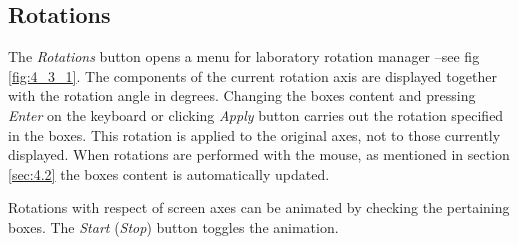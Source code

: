 \documentclass[10pt]{article}
\begin{document}
\subsection{Rotations \label{sec:4.3}}

The {\it Rotations} button opens a menu for laboratory rotation manager --see fig
\ref{fig:4_3_1}. The components of the current rotation axis are displayed together
with the rotation angle in degrees. Changing the boxes content and pressing {\it Enter} on the keyboard or clicking
{\it Apply} button carries out the rotation specified in the boxes.
This rotation is applied to the original axes, not to those currently displayed.
When rotations are performed with the mouse, as mentioned in section \ref{sec:4.2}
the boxes content is automatically updated.

Rotations with respect of screen axes can be animated 
by checking the pertaining
boxes. The {\it Start} ({\it Stop}) button toggles the animation. 
\end{document}
